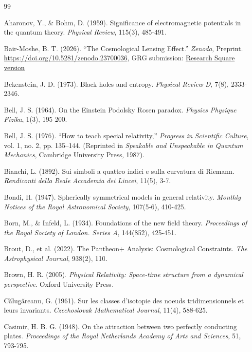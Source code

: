 \begin{thebibliography}{99}

Aharonov, Y., \& Bohm, D. (1959). Significance of electromagnetic potentials in the quantum theory. \textit{Physical Review}, 115(3), 485-491.

Bair-Moshe, B. T. (2026).
``The Cosmological Lensing Effect.''
\textit{Zenodo}, Preprint.
\url{https://doi.org/10.5281/zenodo.23700036}, GRG submission: \href{https://doi.org/10.21203/rs.3.rs-8896448/v1}{Research Square version}

Bekenstein, J. D. (1973). Black holes and entropy. \textit{Physical Review D}, 7(8), 2333-2346.

Bell, J. S. (1964). On the Einstein Podolsky Rosen paradox. \textit{Physics Physique Fizika}, 1(3), 195-200.

Bell, J. S. (1976). ``How to teach special relativity,'' \textit{Progress in Scientific Culture}, vol. 1, no. 2, pp. 135--144. (Reprinted in \textit{Speakable and Unspeakable in Quantum Mechanics}, Cambridge University Press, 1987).

Bianchi, L. (1892). Sui simboli a quattro indici e sulla curvatura di Riemann. \textit{Rendiconti della Reale Accademia dei Lincei}, 11(5), 3-7.

Bondi, H. (1947). Spherically symmetrical models in general relativity. \textit{Monthly Notices of the Royal Astronomical Society}, 107(5-6), 410-425.

Born, M., \& Infeld, L. (1934). Foundations of the new field theory. \textit{Proceedings of the Royal Society of London. Series A}, 144(852), 425-451.

Brout, D., et al. (2022). The Pantheon+ Analysis: Cosmological Constraints. \textit{The Astrophysical Journal}, 938(2), 110.

Brown, H. R. (2005). \textit{Physical Relativity: Space-time structure from a dynamical perspective}. Oxford University Press.

C\u{a}lug\u{a}reanu, G. (1961). Sur les classes d'isotopie des noeuds tridimensionnels et leurs invariants. \textit{Czechoslovak Mathematical Journal}, 11(4), 588-625.

Casimir, H. B. G. (1948). On the attraction between two perfectly conducting plates. \textit{Proceedings of the Royal Netherlands Academy of Arts and Sciences}, 51, 793-795.


\end{thebibliography}
